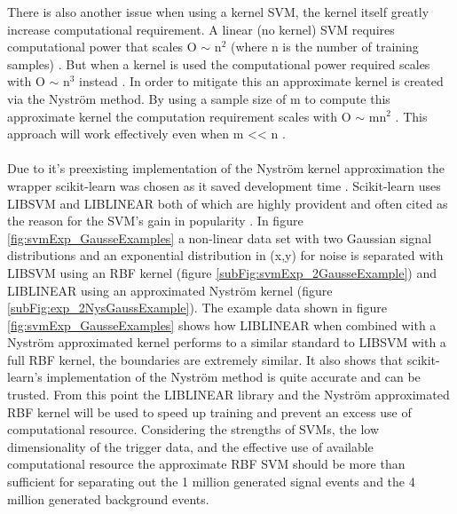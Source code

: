 There is also another issue when using a kernel SVM, the kernel itself greatly increase computational requirement. A linear (no kernel) SVM requires computational power that scales O $\sim$ n$^2$ (where n is the number of training samples) \cite{cortes1995support}. But when a kernel is used the computational power required scales with O $\sim$ n$^3$ instead \cite{williams2001using}. In order to mitigate this an approximate kernel is created via the Nyström method. By using a sample size of m to compute this approximate kernel the computation requirement scales with O $\sim$ mn$^2$ \cite{williams2001using}. This approach will work effectively even when m << n \cite{williams2001using}. 
\\\\Due to it's preexisting implementation of the Nyström kernel approximation the wrapper scikit-learn was chosen as it saved development time \cite{scikit-learn}. Scikit-learn uses LIBSVM \cite{chang2011libsvm} and LIBLINEAR \cite{fan2008liblinear} both of which are highly provident and often cited as the reason for the SVM's gain in popularity \cite{murty2016support}. In figure \ref{fig:svmExp_GausseExamples} a non-linear data set with two Gaussian signal distributions and an exponential distribution in (x,y) for noise is separated with LIBSVM using an RBF kernel (figure \ref{subFig:svmExp_2GausseExample}) and LIBLINEAR using an approximated Nyström kernel (figure \ref{subFig:exp_2NysGaussExample}). The example data shown in figure \ref{fig:svmExp_GausseExamples} shows how LIBLINEAR when combined with a Nyström approximated kernel performs to a similar standard to LIBSVM with a full RBF kernel, the boundaries are extremely similar. It also shows that scikit-learn's implementation of the Nyström method is quite accurate and can be trusted. From this point the LIBLINEAR library and the Nyström approximated RBF kernel will be used to speed up training and prevent an excess use of computational resource. Considering the strengths of SVMs, the low dimensionality of the trigger data, and the effective use of available computational resource the approximate RBF SVM should be more than sufficient for separating out the 1 million generated signal events and the 4 million generated background events. 

